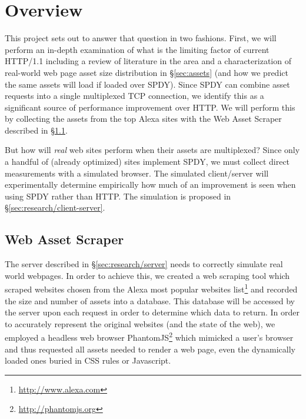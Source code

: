 \documentclass[11pt,letterpaper,notitlepage]{article}
\begin{document}
\section{Overview}
\label{sec:research/overview}
This project sets out to answer that question in two fashions. First, we will
perform an in-depth examination of what is the limiting factor of current
HTTP/1.1 including a review of literature in the area and a characterization of
real-world web page asset size distribution in \S\ref{sec:assets} (and
how we predict the same assets will load if loaded over SPDY). Since SPDY can
combine asset requests into a single multiplexed TCP connection, we identify
this as a significant source of performance improvement over HTTP. We will
perform this by collecting the assets from the top Alexa sites with the Web
Asset Scraper described in \S\ref{sec:research/scraper}.

But how will \textit{real} web sites perform when their assets are multiplexed?
Since only a handful of (already optimized) sites implement SPDY, we must
collect direct measurements with a simulated browser. The simulated
client/server will experimentally determine empirically how much of an
improvement is seen when using SPDY rather than HTTP.  The simulation is
proposed in \S\ref{sec:research/client-server}.

\subsection{Web Asset Scraper}
\label{sec:research/scraper}
The server described in \S\ref{sec:research/server} needs to correctly simulate
real world webpages. In order to achieve this, we created a web scraping tool
which scraped websites chosen from the Alexa most popular websites
list\footnote{\url{http://www.alexa.com}} and recorded the size and number of
assets into a database.  This database will be accessed by the server upon each
request in order to determine which data to return.  In order to accurately
represent the original websites (and the state of the web), we employed a
headless web browser PhantomJS\footnote{\url{http://phantomjs.org}} which
mimicked a user's browser and thus requested all assets needed to render a web
page, even the dynamically loaded ones buried in CSS rules or Javascript.
\end{document}
